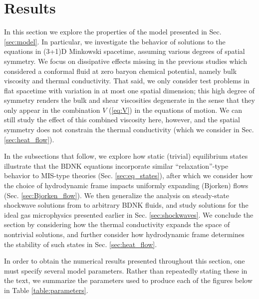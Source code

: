 \documentclass[%
notitlepage,
superscriptaddress,
nofootinbib,
amsmath,
amssymb,
aps,
twocolumn
]{revtex4-1}
\begin{document}
\section{Results} \label{sec:results}
In this section we explore the properties of the model presented in Sec.
\ref{sec:model}.  In particular, we investigate the behavior of solutions
to the equations in (3+1)D Minkowski spacetime, assuming various degrees of
spatial symmetry. We focus on dissipative effects missing in
the previous studies \cite{Pandya_2021,Pandya:2022pif} which considered a
conformal fluid at zero baryon chemical potential,
namely bulk viscosity and thermal conductivity.
That said, we only consider test problems in flat spacetime with variation
in at most one spatial dimension; this high degree of symmetry renders the
bulk and shear viscosities degenerate in the sense that they only appear in
the combination $V$ (\ref{eq:V}) in the equations of motion. 
We can still study the effect of this combined viscosity here, however, and
the spatial symmetry does not constrain the thermal conductivity (which we
consider in Sec. \ref{sec:heat_flow}).

In the subsections that follow, we explore how static (trivial) equilibrium
states illustrate that the BDNK equations incorporate similar
``relaxation''-type behavior to MIS-type theories (Sec.
\ref{sec:eq_states}), after which we consider how the choice of
hydrodynamic frame impacts uniformly expanding (Bjorken) flows (Sec.
\ref{sec:Bjorken_flow}).  We then generalize the analysis on steady-state
shockwave solutions from \cite{Pandya_2021} to arbitrary BDNK fluids, and
study solutions for the ideal gas microphysics presented earlier in Sec.
\ref{sec:shockwaves}.  We conclude the section by considering how the
thermal conductivity expands the space of nontrivial solutions, and further
consider how hydrodynamic frame determines the stability of such states in
Sec. \ref{sec:heat_flow}.

In order to obtain the numerical results presented throughout this section,
one must specify several model parameters.  Rather than repeatedly stating
these in the text, we summarize the parameters used to produce each of the
figures below in Table \ref{table:parameters}.
\end{document}
